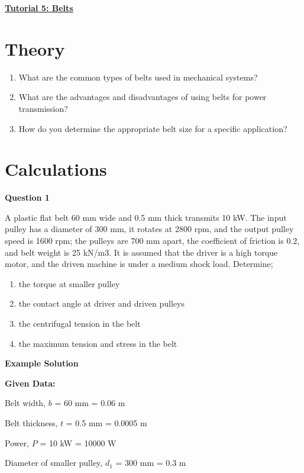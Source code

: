 \documentclass[a4paper, fleqn]{article}
\begin{document}
\underline{\textbf{Tutorial 5: Belts}}
\vspace{10pt}

\section*{Theory}
\begin{enumerate}
    \item What are the common types of belts used in mechanical systems?
    \item What are the advantages and disadvantages of using belts for power transmission?
    \item How do you determine the appropriate belt size for a specific application?

\end{enumerate}


\section*{Calculations}

\textbf{Question 1}

A plastic flat belt 60 mm wide and 0.5 mm thick transmits 10 kW. The input pulley has a diameter of 300 mm, it rotates at 2800 rpm, and the output pulley speed is 1600 rpm; the pulleys are 700 mm apart, the coefficient of friction is 0.2, and belt weight is 25 kN/m3. It is assumed that the driver is a high torque motor, and the driven machine is under a medium shock load. Determine;

\begin{enumerate}[label=(\roman*)]
    \item the torque at smaller pulley
    \item the contact angle at driver and driven pulleys
    \item the centrifugal tension in the belt
    \item the maximum tension and stress in the belt
\end{enumerate}
 
\vspace{10pt}
\textbf{Example Solution}
\vspace{10pt}

\textbf{Given Data:}


Belt width, $b$ = 60 mm = 0.06 m

Belt thickness, $t$ = 0.5 mm = 0.0005 m

Power, $P$ = 10 kW = 10000 W

Diameter of smaller pulley, $d_1$ = 300 mm = 0.3 m
\end{document}

